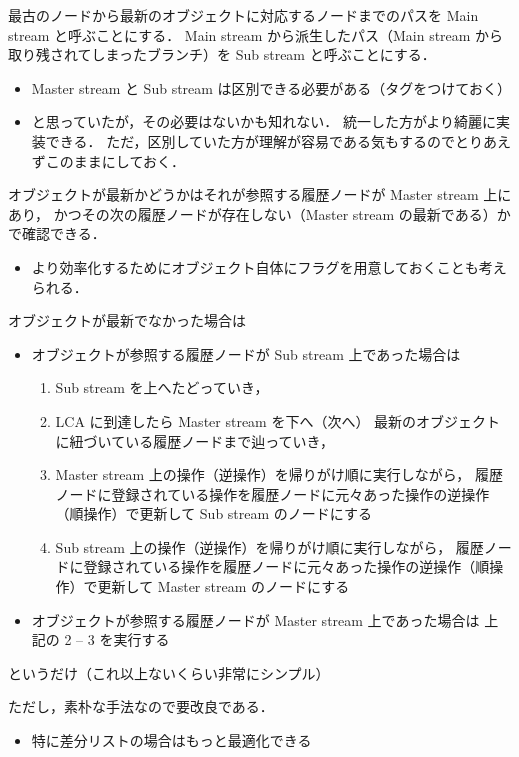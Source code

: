 \documentclass[10pt, a4j, twocolumn]{scrartcl}
\begin{document}
最古のノードから最新のオブジェクトに対応するノードまでのパスを
Main stream と呼ぶことにする．
Main stream から派生したパス（Main stream から取り残されてしまったブランチ）を
Sub stream と呼ぶことにする．
\begin{itemize}
\item Master stream と Sub stream は区別できる必要がある（タグをつけておく）
\item と思っていたが，その必要はないかも知れない．
統一した方がより綺麗に実装できる．
ただ，区別していた方が理解が容易である気もするのでとりあえずこのままにしておく．
\end{itemize}



オブジェクトが最新かどうかはそれが参照する履歴ノードが Master stream 上にあり，
かつその次の履歴ノードが存在しない（Master stream の最新である）かで確認できる．
\begin{itemize}
\item より効率化するためにオブジェクト自体にフラグを用意しておくことも考えられる．
\end{itemize}


オブジェクトが最新でなかった場合は
\begin{itemize}
\item オブジェクトが参照する履歴ノードが Sub stream 上であった場合は
\begin{enumerate}
\item Sub stream を上へたどっていき，
\item LCA に到達したら Master stream を下へ（次へ）
最新のオブジェクトに紐づいている履歴ノードまで辿っていき，
\item Master stream 上の操作（逆操作）を帰りがけ順に実行しながら，
履歴ノードに登録されている操作を履歴ノードに元々あった操作の逆操作（順操作）で更新して
Sub stream のノードにする
\item Sub stream 上の操作（逆操作）を帰りがけ順に実行しながら，
履歴ノードに登録されている操作を履歴ノードに元々あった操作の逆操作（順操作）で更新して
Master stream のノードにする
\end{enumerate}
\item オブジェクトが参照する履歴ノードが Master stream 上であった場合は
上記の 2 -- 3 を実行する
\end{itemize}


というだけ（これ以上ないくらい非常にシンプル）

ただし，素朴な手法なので要改良である．
\begin{itemize}
\item 特に差分リストの場合はもっと最適化できる
\end{itemize}
\end{document}
